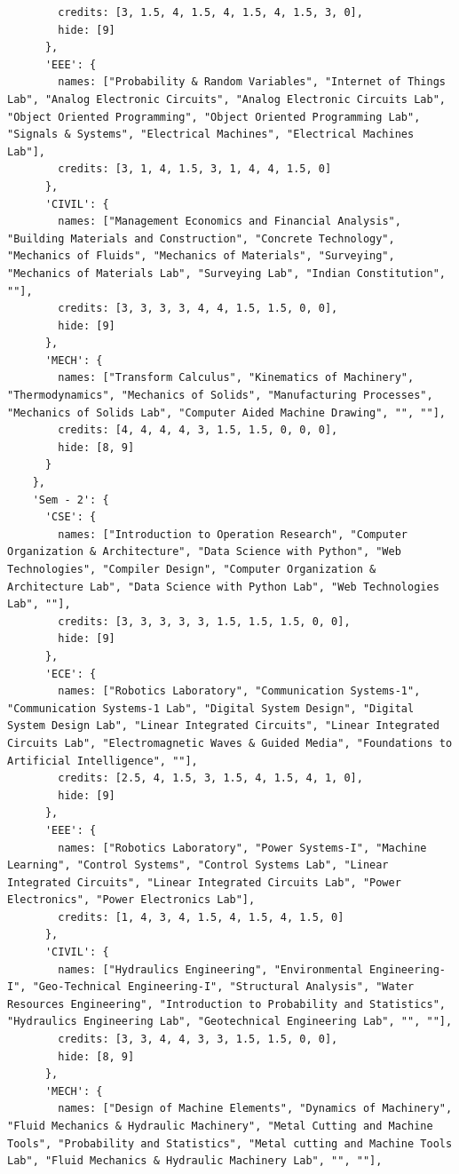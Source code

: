 \documentclass[11pt,a4paper,oneside]{article}
\begin{document}
\begin{lstlisting}
        credits: [3, 1.5, 4, 1.5, 4, 1.5, 4, 1.5, 3, 0],
        hide: [9]
      },
      'EEE': {
        names: ["Probability & Random Variables", "Internet of Things Lab", "Analog Electronic Circuits", "Analog Electronic Circuits Lab", "Object Oriented Programming", "Object Oriented Programming Lab", "Signals & Systems", "Electrical Machines", "Electrical Machines Lab"],
        credits: [3, 1, 4, 1.5, 3, 1, 4, 4, 1.5, 0]
      },
      'CIVIL': {
        names: ["Management Economics and Financial Analysis", "Building Materials and Construction", "Concrete Technology", "Mechanics of Fluids", "Mechanics of Materials", "Surveying", "Mechanics of Materials Lab", "Surveying Lab", "Indian Constitution", ""],
        credits: [3, 3, 3, 3, 4, 4, 1.5, 1.5, 0, 0],
        hide: [9]
      },
      'MECH': {
        names: ["Transform Calculus", "Kinematics of Machinery", "Thermodynamics", "Mechanics of Solids", "Manufacturing Processes", "Mechanics of Solids Lab", "Computer Aided Machine Drawing", "", ""],
        credits: [4, 4, 4, 4, 3, 1.5, 1.5, 0, 0, 0],
        hide: [8, 9]
      }
    },
    'Sem - 2': {
      'CSE': {
        names: ["Introduction to Operation Research", "Computer Organization & Architecture", "Data Science with Python", "Web Technologies", "Compiler Design", "Computer Organization & Architecture Lab", "Data Science with Python Lab", "Web Technologies Lab", ""],
        credits: [3, 3, 3, 3, 3, 1.5, 1.5, 1.5, 0, 0],
        hide: [9]
      },
      'ECE': {
        names: ["Robotics Laboratory", "Communication Systems-1", "Communication Systems-1 Lab", "Digital System Design", "Digital System Design Lab", "Linear Integrated Circuits", "Linear Integrated Circuits Lab", "Electromagnetic Waves & Guided Media", "Foundations to Artificial Intelligence", ""],
        credits: [2.5, 4, 1.5, 3, 1.5, 4, 1.5, 4, 1, 0],
        hide: [9]
      },
      'EEE': {
        names: ["Robotics Laboratory", "Power Systems-I", "Machine Learning", "Control Systems", "Control Systems Lab", "Linear Integrated Circuits", "Linear Integrated Circuits Lab", "Power Electronics", "Power Electronics Lab"],
        credits: [1, 4, 3, 4, 1.5, 4, 1.5, 4, 1.5, 0]
      },
      'CIVIL': {
        names: ["Hydraulics Engineering", "Environmental Engineering-I", "Geo-Technical Engineering-I", "Structural Analysis", "Water Resources Engineering", "Introduction to Probability and Statistics", "Hydraulics Engineering Lab", "Geotechnical Engineering Lab", "", ""],
        credits: [3, 3, 4, 4, 3, 3, 1.5, 1.5, 0, 0],
        hide: [8, 9]
      },
      'MECH': {
        names: ["Design of Machine Elements", "Dynamics of Machinery", "Fluid Mechanics & Hydraulic Machinery", "Metal Cutting and Machine Tools", "Probability and Statistics", "Metal cutting and Machine Tools Lab", "Fluid Mechanics & Hydraulic Machinery Lab", "", ""],

\end{lstlisting}
\end{document}
